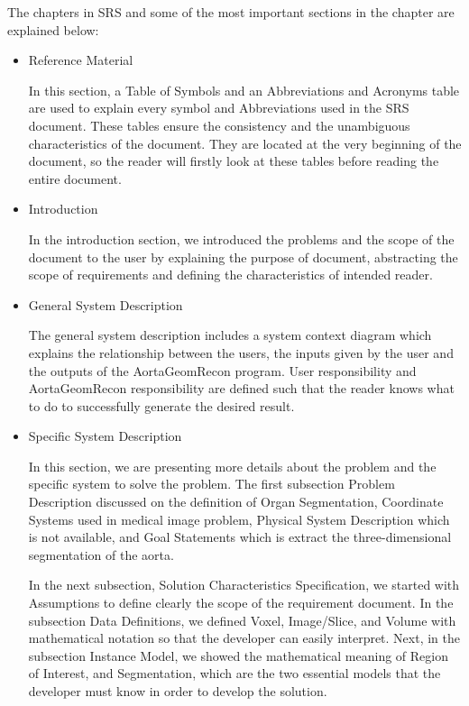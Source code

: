 The chapters in SRS and some of the most important sections in the chapter are explained below:
\begin{itemize}
\item Reference Material

In this section, a Table of Symbols and an Abbreviations and Acronyms table are used to explain every symbol and Abbreviations used in the SRS document. These tables ensure the consistency and the unambiguous characteristics of the document. They are located at the very beginning of the document, so the reader will firstly look at these tables before reading the entire document.

\item Introduction

In the introduction section, we introduced the problems and the scope of the document to the user by explaining the purpose of document, abstracting the scope of requirements and defining the characteristics of intended reader. 

\item General System Description

The general system description includes a system context diagram which explains the relationship between the users, the inputs given by the user and the outputs of the AortaGeomRecon program. User responsibility and AortaGeomRecon responsibility are defined such that the reader knows what to do to successfully generate the desired result. 

\item Specific System Description

In this section, we are presenting more details about the problem and the specific system to solve the problem. The first subsection Problem Description discussed on the definition of Organ Segmentation, Coordinate Systems used in medical image problem, Physical System Description which is not available, and Goal Statements which is extract the three-dimensional segmentation of the aorta.

In the next subsection, Solution Characteristics Specification, we started with Assumptions to define clearly the scope of the requirement document. In the subsection Data Definitions, we defined Voxel, Image/Slice, and Volume with mathematical notation so that the developer can easily interpret. Next, in the subsection Instance Model, we showed the mathematical meaning of Region of Interest, and Segmentation, which are the two essential models that the developer must know in order to develop the solution.



\end{itemize}
